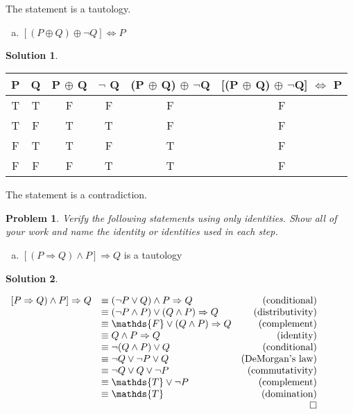 \documentclass{article}
\newtheorem{problem}{Problem}
\theoremstyle{definition}
\newtheorem*{solution}{Solution}
\begin{document}
The statement is a tautology.\\

\pagebreak
\begin{enumerate}[(c)]
\item \( [(P \oplus Q) \oplus \neg Q] \Leftrightarrow P\)
\end{enumerate}

\begin{solution}
\end{solution}

\begin{tabular}{|c|c|c|c|c|c|}
  \hline
  P & Q & P $\oplus$ Q & $\neg$ Q & (P $\oplus$ Q) $\oplus$ $\neg$Q & [(P $\oplus$ Q) $\oplus$ $\neg$Q] $\Leftrightarrow$ P  \\
  \hline
  T & T & F & F & F & F \\
  T & F & T & T & F & F \\
  F & T & T & F & T & F \\
  F & F & F & T & T & F \\
  \hline
\end{tabular} 
\medskip \par
The statement is a contradiction.\\

\begin{problem}
Verify the following statements using only identities. Show
all of your work and name the identity or identities used in each step.
\end{problem}

\begin{enumerate}[(a)]
\item \( [(P \Rightarrow Q) \land P] \Rightarrow Q\) is a tautology 
\end{enumerate}

\begin{solution}
\end{solution}

\(
\begin{array}{llr}
	[P \Rightarrow Q) \land P] \Rightarrow Q & \equiv (\neg P \lor Q) \land P \Rightarrow Q & \text{(conditional)} \\
	&\equiv (\neg P \land P) \lor (Q \land P) \Rightarrow Q & \text{(distributivity)} \\
	&\equiv \mathds{F} \lor (Q \land P) \Rightarrow Q  & \text{(complement)} \\
	&\equiv Q \land P \Rightarrow Q & \text{(identity)} \\
	&\equiv \neg (Q \land P) \lor Q & \text{(conditional)} \\
	&\equiv \neg Q \lor \neg P \lor Q & \text{(DeMorgan's law)} \\
	&\equiv \neg Q \lor Q \lor \neg P & \text{(commutativity)} \\
	&\equiv \mathds{T} \lor \neg P & \text{(complement)} \\
	&\equiv \mathds{T} & \text{(domination)} \\
	&&\qed
\end{array}
\)
\end{document}
